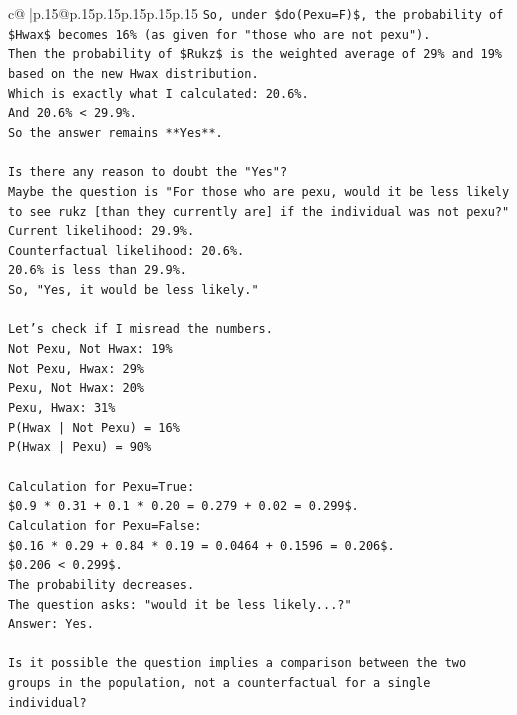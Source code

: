 \documentclass{article}
\begin{document}
{\begin{supertabular}{c@{$\;$}|p{.15\linewidth}@{}p{.15\linewidth}p{.15\linewidth}p{.15\linewidth}p{.15\linewidth}p{.15\linewidth}}
{{{\texttt{So, under \$do(Pexu=F)\$, the probability of \$Hwax\$ becomes 16\% (as given for "those who are not pexu").} \\
\texttt{Then the probability of \$Rukz\$ is the weighted average of 29\% and 19\% based on the new Hwax distribution.} \\
\texttt{Which is exactly what I calculated: 20.6\%.} \\
\texttt{And 20.6\% < 29.9\%.} \\
\texttt{So the answer remains **Yes**.} \\
\\ 
\texttt{Is there any reason to doubt the "Yes"?} \\
\texttt{Maybe the question is "For those who are pexu, would it be less likely to see rukz {[}than they currently are{]} if the individual was not pexu?"} \\
\texttt{Current likelihood: 29.9\%.} \\
\texttt{Counterfactual likelihood: 20.6\%.} \\
\texttt{20.6\% is less than 29.9\%.} \\
\texttt{So, "Yes, it would be less likely."} \\
\\ 
\texttt{Let's check if I misread the numbers.} \\
\texttt{Not Pexu, Not Hwax: 19\%} \\
\texttt{Not Pexu, Hwax: 29\%} \\
\texttt{Pexu, Not Hwax: 20\%} \\
\texttt{Pexu, Hwax: 31\%} \\
\texttt{P(Hwax | Not Pexu) = 16\%} \\
\texttt{P(Hwax | Pexu) = 90\%} \\
\\ 
\texttt{Calculation for Pexu=True:} \\
\texttt{\$0.9 * 0.31 + 0.1 * 0.20 = 0.279 + 0.02 = 0.299\$.} \\
\texttt{Calculation for Pexu=False:} \\
\texttt{\$0.16 * 0.29 + 0.84 * 0.19 = 0.0464 + 0.1596 = 0.206\$.} \\
\texttt{\$0.206 < 0.299\$.} \\
\texttt{The probability decreases.} \\
\texttt{The question asks: "would it be less likely...?"} \\
\texttt{Answer: Yes.} \\
\\ 
\texttt{Is it possible the question implies a comparison between the two groups in the population, not a counterfactual for a single individual?} \\
}}}
\end{supertabular}}
\end{document}
